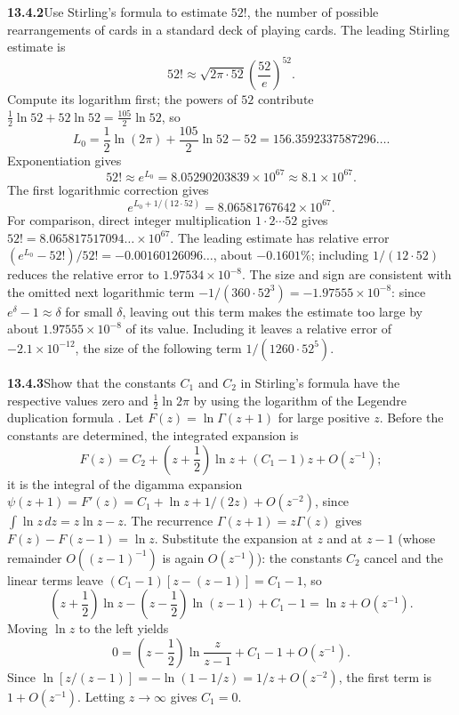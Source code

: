 \par\bigskip
\noindent\textbf{13.4.2}\quad Use Stirling's formula to estimate $52!$, the
number of possible rearrangements of cards in a standard deck of playing
cards.
\solution
The leading Stirling estimate is
\[
52!\approx\sqrt{2\pi\cdot52}\left(\frac{52}{e}\right)^{52}.
\]
Compute its logarithm first; the powers of $52$ contribute
$\frac12\ln52+52\ln52=\frac{105}2\ln52$, so
\[
L_0=\frac12\ln(2\pi)+\frac{105}{2}\ln52-52
=156.3592337587296\ldots.
\]
Exponentiation gives
\[
\boxed{52!\approx e^{L_0}=8.05290203839\times10^{67}
\approx8.1\times10^{67}}.
\]
The first logarithmic correction gives
\[
e^{L_0+1/(12\cdot52)}=8.06581767642\times10^{67}.
\]
For comparison, direct integer multiplication $1\cdot2\cdots52$
gives $52!=8.065817517094\ldots\times10^{67}$.  The leading
estimate has relative error $(e^{L_0}-52!)/52!=-0.00160126096\ldots$,
about $-0.1601\%$; including $1/(12\cdot52)$ reduces the relative
error to $1.97534\times10^{-8}$.  The size and sign are consistent
with the omitted next logarithmic term
$-1/(360\cdot52^3)=-1.97555\times10^{-8}$: since
$e^\delta-1\approx\delta$ for small $\delta$, leaving out this term
makes the estimate too large by about $1.97555\times10^{-8}$ of
its value.  Including it leaves a relative error of
$-2.1\times10^{-12}$, the size of the following term
$1/(1260\cdot52^5)$.


\par\bigskip
\noindent\textbf{13.4.3}\quad Show that the constants $C_{1}$ and $C_{2}$ in
Stirling's formula have the respective values zero and
$\frac{1}{2}\ln2\pi$ by using the logarithm of the Legendre duplication
formula .
\solution
Let $F(z)=\ln\Gamma(z+1)$ for large positive $z$.  Before the
constants are determined, the integrated expansion is
\[
F(z)=C_2+\left(z+\frac12\right)\ln z+(C_1-1)z+O(z^{-1});
\]
it is the integral of the digamma expansion
$\psi(z+1)=F'(z)=C_1+\ln z+1/(2z)+O(z^{-2})$, since
$\int\ln z\,dz=z\ln z-z$.
The recurrence $\Gamma(z+1)=z\Gamma(z)$ gives
$F(z)-F(z-1)=\ln z$.  Substitute the expansion at $z$ and at
$z-1$ (whose remainder $O((z-1)^{-1})$ is again $O(z^{-1})$): the
constants $C_2$ cancel and the linear terms leave
$(C_1-1)[z-(z-1)]=C_1-1$, so
\[
\left(z+\frac12\right)\ln z-\left(z-\frac12\right)\ln(z-1)+C_1-1
=\ln z+O(z^{-1}).
\]
Moving $\ln z$ to the left yields
\[
0=\left(z-\frac12\right)\ln\frac z{z-1}+C_1-1+O(z^{-1}).
\]
Since $\ln[z/(z-1)]=-\ln(1-1/z)=1/z+O(z^{-2})$,
the first term is $1+O(z^{-1})$.  Letting $z\to\infty$ gives
$\boxed{C_1=0}$.

